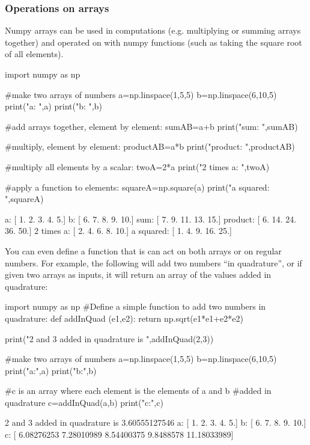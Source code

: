 \subsubsection{Operations on arrays}
Numpy arrays can be used in computations (e.g. multiplying or summing arrays together) and operated on with numpy functions (such as taking the square root of all elements).
 
\begin{python}[caption = Numpy operations on arrays]
import numpy as np

#make two arrays of numbers
a=np.linspace(1,5,5)
b=np.linspace(6,10,5)
print("a: ",a)
print("b: ",b)

#add arrays together, element by element:
sumAB=a+b
print("sum: ",sumAB)

#multiply, element by element:
productAB=a*b
print("product: ",productAB)

#multiply all elements by a scalar:
twoA=2*a
print("2 times a: ",twoA)

#apply a function to elements:
squareA=np.square(a)
print("a squared: ",squareA)
\end{python} 
\begin{poutput}
a: [ 1.  2.  3.  4.  5.]
b: [  6.   7.   8.   9.  10.]
sum: [  7.   9.  11.  13.  15.]
product: [  6.  14.  24.  36.  50.]
2 times a: [  2.   4.   6.   8.  10.]
a squared: [  1.   4.   9.  16.  25.]
\end{poutput}

You can even define a function that is can act on both arrays or on regular numbers. For example, the following will add two numbers ``in quadrature'', or if given two arrays as inputs, it will return an array of the values added in quadrature:
\begin{python}[caption = Defining a function to operated on a numpy array]
import numpy as np
#Define a simple function to add two numbers in quadrature:
def addInQuad (e1,e2):
  return np.sqrt(e1*e1+e2*e2)

print("2 and 3 added in quadrature is ",addInQuad(2,3))

#make two arrays of numbers
a=np.linspace(1,5,5)
b=np.linspace(6,10,5)
print("a:",a)
print("b:",b)

#c is an array where each element is the elements of a and b 
#added in quadrature
c=addInQuad(a,b)
print("c:",c)
\end{python} 
\begin{poutput}
2 and 3 added in quadrature is  3.60555127546
a: [ 1.  2.  3.  4.  5.]
b: [  6.   7.   8.   9.  10.]
c: [  6.08276253   7.28010989   8.54400375   9.8488578   11.18033989]
\end{poutput}
